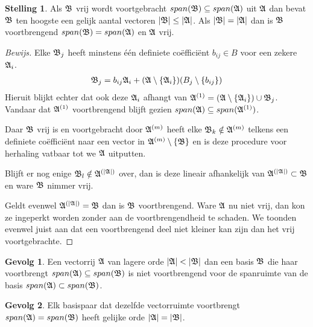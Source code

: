 \documentclass{amsart}
\theoremstyle{definition}
\newtheorem{thm}{Stelling}[section]
\newtheorem{csq}{Gevolg}[section]
\newenvironment{bewijs}{\begin{proof}[Bewijs]}{\end{proof}}
\newcommand{\setsm}[1]{\{{#1}\}}
\newcommand{\without}[1]{\setminus\setsm{#1}}
\newcommand{\abs}[1]{\lvert{#1}\rvert}
\newcommand{\vecrow}[1][a]{\mathfrak{\MakeUppercase{#1}}}
\newcommand{\rvec}[2][i]{{#2}_{#1}}
\newcommand{\rvecr}[2][i]{\rvec[#1]{\vecrow[#2]}}
\begin{document}
\begin{thm}
    Als $\vecrow[b]$ vrij wordt voortgebracht $span(\vecrow[b]) \subseteq span(\vecrow)$ uit $\vecrow$ dan bevat $\vecrow[b]$ ten hoogste een gelijk aantal vectoren $\abs{\vecrow[b]} \leq \abs\vecrow$.
    Als $\abs{\vecrow[b]} = \abs\vecrow$ dan is $\vecrow[b]$ voortbrengend $span(\vecrow[b]) = span(\vecrow)$ en $\vecrow$ vrij.
    \begin{bewijs}
        Elke $\vecrow[b]_j$ heeft minstens één definiete coëfficiënt $b_{ij} \in B$ voor een zekere $\vecrow_i$.
        \begin{align*}
            \vecrow[b]_j = b_{ij}\vecrow_i + (\vecrow \without{\vecrow_i})(B_j  \without{b_{ij}})
        \end{align*}
        Hieruit blijkt echter dat ook deze $\vecrow_i$ afhangt van  $\vecrow^{(1)} = \left(\vecrow \without{\vecrow_i}\right) \cup \rvecr[j]{b}$.
        Vandaar dat $\vecrow^{(1)}$ voortbrengend blijft gezien $span(\vecrow) \subseteq span(\vecrow^{(1)})$.

        Daar $\vecrow[b]$ vrij is en voortgebracht door $\vecrow^{(m)}$ heeft elke $\rvecr[k]{b} \notin \vecrow^{(m)}$ telkens een definiete coëfficiënt naar een vector in $\vecrow^{(m)}\without{\vecrow[b]}$
        en is deze procedure voor herhaling vatbaar tot we $\vecrow$ uitputten.

        Blijft er nog enige $\vecrow[b]_l \notin \vecrow^{(\abs{\vecrow})}$ over,
        dan is deze lineair afhankelijk van $\vecrow^{(\abs\vecrow)} \subset \vecrow[b]$ en ware $\vecrow[b]$ nimmer vrij.

        Geldt evenwel $\vecrow^{(\abs{\vecrow})} = \vecrow[b]$ dan is $\vecrow[b]$ voortbrengend.
        Ware $\vecrow$ nu niet vrij, dan kon ze ingeperkt worden zonder aan de voortbrengendheid te schaden.
        We toonden evenwel juist aan dat een voortbrengend deel niet kleiner kan zijn dan het vrij voortgebrachte.
    \end{bewijs}
\end{thm}

\begin{csq}
    Een vectorrij $\vecrow$ van lagere orde $\abs\vecrow < \abs{\vecrow[b]}$ dan een basis $\vecrow[b]$ die haar voortbrengt $span(\vecrow) \subseteq span(\vecrow[b])$ is niet voortbrengend voor de spanruimte van de basis $span(\vecrow) \subset span(\vecrow[b])$.
\end{csq}

\begin{csq}
    Elk basispaar dat dezelfde vectorruimte voortbrengt $span(\vecrow) = span(\vecrow[b])$ heeft gelijke orde $\abs\vecrow = \abs{\vecrow[b]}$.
\end{csq}
\end{document}

